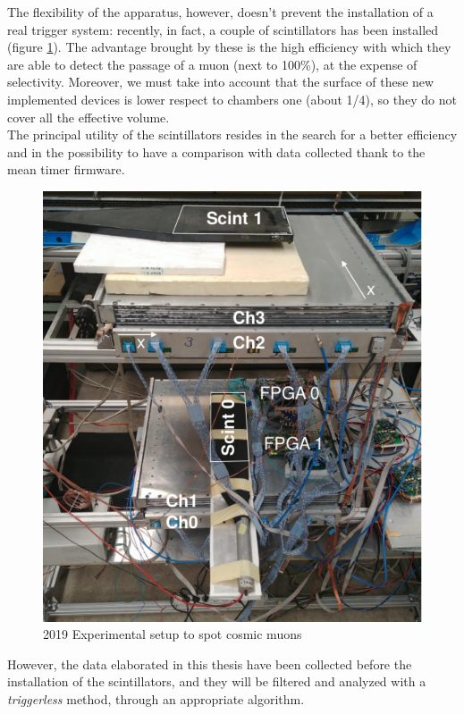 \documentclass[a4paper,11pt]{book}
\begin{document}
The flexibility of the apparatus, however, doesn't prevent the installation of a real trigger system: recently, in fact, a couple of scintillators has been installed (figure \ref{fig:2019_esp_setup_2}). The advantage brought by these is the high efficiency with which they are able to detect the passage of a muon (next to 100\%), at the expense of selectivity. Moreover, we must take into account that the surface of these new implemented devices is lower respect to chambers one (about 1/4), so they do not cover all the effective volume.\\
The principal utility of the scintillators resides in the search for a better efficiency and in the possibility to have a comparison with data collected thank to the mean timer firmware.\\

\begin{figure}[!hbtp]
\centering
\includegraphics[scale=0.5]{pictures/2019_scint.pdf}
\caption{2019 Experimental setup to spot cosmic muons}
\label{fig:2019_esp_setup_2}
\end{figure}


However, the data elaborated in this thesis have been collected before the installation of the scintillators, and they will be filtered and analyzed with a \textit{triggerless} method, through an appropriate algorithm.\\
\end{document}
